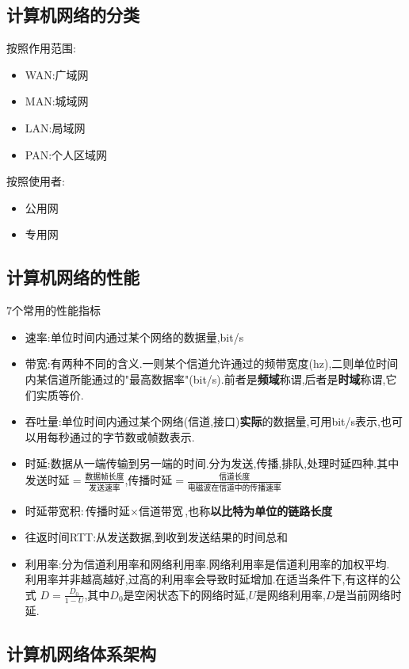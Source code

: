 \documentclass{ctexart}
\begin{document}
\subsection{计算机网络的分类}
按照作用范围:
\begin{itemize}
	\item WAN:广域网
	\item MAN:城域网
	\item LAN:局域网
	\item PAN:个人区域网
\end{itemize}
按照使用者:

\begin{itemize}
	\item 公用网
	\item 专用网
\end{itemize}

\subsection{计算机网络的性能}
7个常用的性能指标
\begin{itemize}
	\item 速率:单位时间内通过某个网络的数据量,bit/s
	\item 带宽:有两种不同的含义.一则某个信道允许通过的频带宽度(hz),二则单位时间内某信道所能通过的"最高数据率"(bit/s).前者是\textbf{频域}称谓,后者是\textbf{时域}称谓,它们实质等价.
	\item 吞吐量:单位时间内通过某个网络(信道,接口)\textbf{实际}的数据量,可用bit/s表示,也可以用每秒通过的字节数或帧数表示.
	\item 时延:数据从一端传输到另一端的时间.分为发送,传播,排队,处理时延四种.其中$\mbox{发送时延}=\frac{\mbox{数据帧长度}}{\mbox{发送速率}}$,$\mbox{传播时延}=\frac{\mbox{信道长度}}{\mbox{电磁波在信道中的传播速率}}$
	\item 时延带宽积:$\mbox{传播时延}\times\mbox{信道带宽}$,也称\textbf{以比特为单位的链路长度}
	\item 往返时间RTT:从发送数据,到收到发送结果的时间总和
	\item 利用率:分为信道利用率和网络利用率.网络利用率是信道利用率的加权平均.\\
	      利用率并非越高越好,过高的利用率会导致时延增加.在适当条件下,有这样的公式
	      $D=\frac{D_0}{1-U}$,其中$D_0$是空闲状态下的网络时延,$U$是网络利用率,$D$是当前网络时延.
\end{itemize}
\subsection{计算机网络体系架构}
\end{document}
